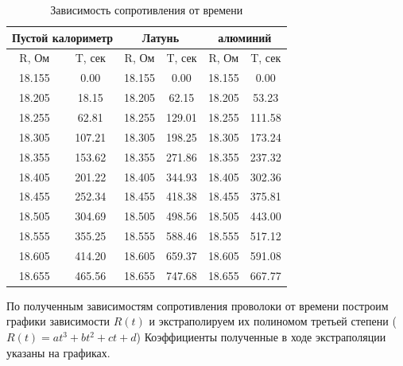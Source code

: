\documentclass[a4paper, 12pt]{article}%
\begin{document}
	\begin{table}[H]
		\centering
		\begin{tabular}{|cc|cc|cc|}
			\hline
			\multicolumn{2}{|c|}{Пустой   калориметр} & \multicolumn{2}{c|}{Латунь}          & \multicolumn{2}{c|}{алюминий}      \\ \hline
			\multicolumn{1}{|c|}{R, Ом}    & T, сек   & \multicolumn{1}{c|}{R, Ом}  & T, сек & \multicolumn{1}{c|}{R, Ом}  & T, сек \\ \hline
			\multicolumn{1}{|c|}{18.155}   & 0.00     & \multicolumn{1}{c|}{18.155} & 0.00   & \multicolumn{1}{c|}{18.155} & 0.00   \\ \hline
			\multicolumn{1}{|c|}{18.205}   & 18.15    & \multicolumn{1}{c|}{18.205} & 62.15  & \multicolumn{1}{c|}{18.205} & 53.23  \\ \hline
			\multicolumn{1}{|c|}{18.255}   & 62.81    & \multicolumn{1}{c|}{18.255} & 129.01 & \multicolumn{1}{c|}{18.255} & 111.58 \\ \hline
			\multicolumn{1}{|c|}{18.305}   & 107.21   & \multicolumn{1}{c|}{18.305} & 198.25 & \multicolumn{1}{c|}{18.305} & 173.24 \\ \hline
			\multicolumn{1}{|c|}{18.355}   & 153.62   & \multicolumn{1}{c|}{18.355} & 271.86 & \multicolumn{1}{c|}{18.355} & 237.32 \\ \hline
			\multicolumn{1}{|c|}{18.405}   & 201.22   & \multicolumn{1}{c|}{18.405} & 344.93 & \multicolumn{1}{c|}{18.405} & 302.36 \\ \hline
			\multicolumn{1}{|c|}{18.455}   & 252.34   & \multicolumn{1}{c|}{18.455} & 418.38 & \multicolumn{1}{c|}{18.455} & 375.81 \\ \hline
			\multicolumn{1}{|c|}{18.505}   & 304.69   & \multicolumn{1}{c|}{18.505} & 498.56 & \multicolumn{1}{c|}{18.505} & 443.00 \\ \hline
			\multicolumn{1}{|c|}{18.555}   & 355.25   & \multicolumn{1}{c|}{18.555} & 588.46 & \multicolumn{1}{c|}{18.555} & 517.12 \\ \hline
			\multicolumn{1}{|c|}{18.605}   & 414.20   & \multicolumn{1}{c|}{18.605} & 659.37 & \multicolumn{1}{c|}{18.605} & 591.08 \\ \hline
			\multicolumn{1}{|c|}{18.655}   & 465.56   & \multicolumn{1}{c|}{18.655} & 747.68 & \multicolumn{1}{c|}{18.655} & 667.77 \\ \hline
		\end{tabular}
	\caption{Зависимость сопротивления от времени}
	\end{table}
	По полученным зависимостям сопротивления проволоки от времени построим графики зависимости $R(t)$ и экстраполируем их полиномом третьей степени ($R(t) = at^{3} + bt^{2} + ct + d$) Коэффициенты полученные в ходе экстраполяции указаны на графиках.
\end{document}
